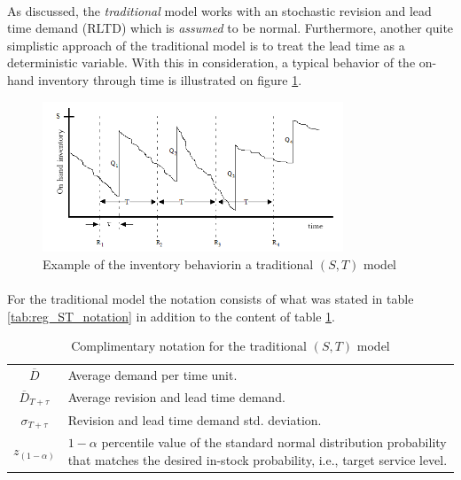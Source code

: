 \documentclass[letterpaper]{article}
\begin{document}
\paragraph{}
As discussed, the \textit{traditional} model works with an stochastic revision and lead time demand (RLTD) which is \textit{assumed} to be normal. Furthermore, another quite simplistic approach of the traditional model is to treat the lead time as a deterministic variable. With this in consideration, a typical behavior of the on-hand inventory through time is illustrated on figure \ref{fig:trad_st_behavior}.

\begin{figure}[!h]
    \centering
        \includegraphics[width=0.8\textwidth]{./figs/ST_ideal_eng_600x300px.png}
    \caption{Example of the inventory behavior\linebreak in a traditional $(S,T)$ model}
    \label{fig:trad_st_behavior}
\end{figure}

\paragraph{}
For the traditional model the notation consists of what was stated in table \ref{tab:reg_ST_notation} in addition to the content of table \ref{tab:trad_ST_notation}.

\begin{table}[!h]
    \begin{center}
        \begin{tabular}{c|l}
            \toprule
            $\overline{D}$ & Average demand per time unit. \\
            $\overline{D}_{T+\tau}$ & Average revision and lead time demand.\\
            $\sigma_{T+\tau}$ & Revision and lead time demand std. deviation. \\
            \multirow{2}{*}{$z_{(1-\alpha)}$} & 
            \begin{minipage}[t]{0.8\columnwidth}
                $1-\alpha$ percentile value of the  standard normal distribution probability that matches the desired in-stock probability, i.e., target service level.	
            \end{minipage} \\
            \bottomrule
        \end{tabular}
    \end{center}
    \caption{Complimentary notation for the traditional $(S,T)$ model}
    \label{tab:trad_ST_notation}
\end{table}
\end{document}

